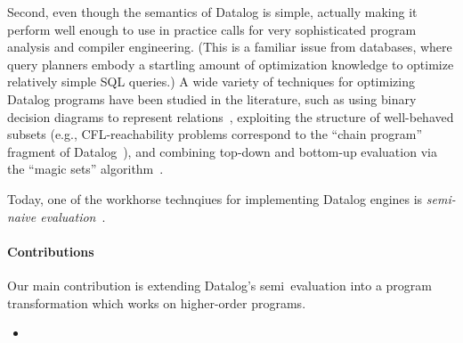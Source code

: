 Second, even though the semantics of Datalog is simple, actually
making it perform well enough to use in practice calls for very
sophisticated program analysis and compiler engineering. (This is a
familiar issue from databases, where query planners embody a startling
amount of optimization knowledge to optimize relatively simple SQL
queries.) A wide variety of techniques for optimizing Datalog programs
have been studied in the literature, such as using binary decision
diagrams to represent relations~\cite{whaley-phd}, exploiting the
structure of well-behaved subsets (e.g., CFL-reachability problems
correspond to the ``chain program'' fragment of
Datalog~\cite{chain-programs}), and combining top-down and bottom-up
evaluation via the ``magic sets'' algorithm~\cite{magic-sets}.

Today, one of the workhorse technqiues for implementing Datalog
engines is \emph{semi-naive evaluation}~\cite{semi-naive}. 


\paragraph{Contributions} Our main contribution is
extending Datalog's semi\naive\ evaluation into a program transformation which
works on higher-order programs.

\begin{itemize}
\item \XXX



\end{itemize}


